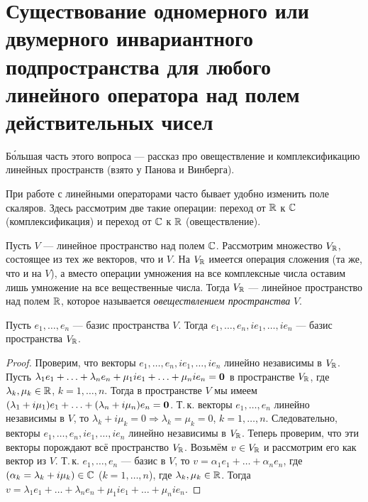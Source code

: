 \section{Существование одномерного или двумерного инвариантного подпространства для любого линейного оператора над полем действительных чисел}

Б\'{о}льшая часть этого вопроса --- рассказ про овеществление и комплексификацию линейных пространств (взято у Панова и Винберга).

При работе с линейными операторами часто бывает удобно изменить поле скаляров. Здесь рассмотрим две такие операции: переход от $\mathbb{R}$ к $\mathbb{C}$ (комплексификация) и переход от $\mathbb{C}$ к $\mathbb{R}$ (овеществление).

\begin{definition}
    Пусть $V$ --- линейное пространство над полем $\mathbb{C}$. Рассмотрим множество $V_{\mathbb{R}}$, состоящее из тех же векторов, что и $V$. На $V_{\mathbb{R}}$ имеется операция сложения (та же, что и на $V$), а вместо операции умножения на все комплексные числа оставим лишь умножение на все вещественные числа. Тогда $V_{\mathbb{R}}$ --- линейное пространство над полем $\mathbb{R}$, которое называется \textit{овеществлением пространства} $V$.
\end{definition}

\begin{proposal}
    Пусть $e_1, \ldots, e_n$ --- базис пространства $V$. Тогда $e_1, \ldots, e_n, ie_1, \ldots, ie_n$ --- базис пространства $V_{\mathbb{R}}$.
\end{proposal}

\begin{proof}
    Проверим, что векторы $e_1, \ldots, e_n, ie_1, \ldots, ie_n$ линейно независимы в $V_{\mathbb{R}}$. Пусть $\lambda_1e_1 + \ldots + \lambda_ne_n + \mu_1ie_1 + \ldots + \mu_nie_n = \boldsymbol{0}$ в пространстве $V_{\mathbb{R}}$, где $\lambda_k, \mu_k \in \mathbb{R}$, $k = 1, \ldots, n$. Тогда в пространстве $V$ мы имеем $(\lambda_1 + i\mu_1)e_1 + \ldots + (\lambda_n + i\mu_n)e_n = \boldsymbol{0}$. Т.\,к. векторы $e_1, \ldots, e_n$ линейно независимы в $V$, то $\lambda_k + i\mu_k = 0 \Rightarrow \lambda_k = \mu_k = 0$, $k = 1, \ldots, n$. Следовательно, векторы $e_1, \ldots, e_n, ie_1, \ldots, ie_n$ линейно независимы в $V_{\mathbb{R}}$. Теперь проверим, что эти векторы порождают всё пространство $V_{\mathbb{R}}$. Возьмём $v \in V_{\mathbb{R}}$ и рассмотрим его как вектор из $V$. Т.\,к. $e_1, \ldots, e_n$ --- базис в $V$, то $v = \alpha_1e_1 + \ldots + \alpha_ne_n$, где $(\alpha_k = \lambda_k + i\mu_k) \in \mathbb{C}$ ($k = 1, \ldots, n$), где $\lambda_k, \mu_k \in \mathbb{R}$. Тогда $v = \lambda_1e_1 + \ldots + \lambda_ne_n + \mu_1ie_1 + \ldots + \mu_nie_n$.
\end{proof}

